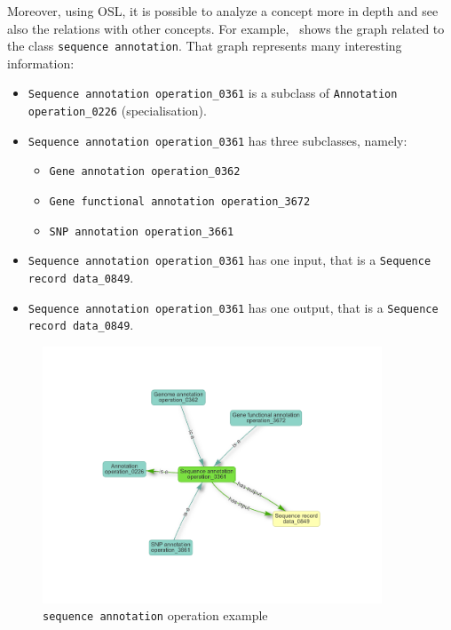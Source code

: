\documentclass{scrartcl}
\begin{document}
Moreover, using OSL, it is possible to analyze a concept more in depth and see also
  the relations with other concepts. For example,~ shows the graph 
  related to the class \texttt{sequence annotation}. That graph represents many interesting
  information:
  \begin{itemize}
    \item \texttt{Sequence annotation operation\_0361} is a subclass of \newline
      \texttt{Annotation operation\_0226} (specialisation).
    \item \texttt{Sequence annotation operation\_0361} has three subclasses, namely:
      \begin{itemize}
        \item \texttt{Gene annotation operation\_0362} 
        \item \texttt{Gene functional annotation operation\_3672} 
        \item \texttt{SNP annotation operation\_3661} 
      \end{itemize}
    \item \texttt{Sequence annotation operation\_0361} has one input, that is a \newline
      \texttt{Sequence record data\_0849}.
    \item \texttt{Sequence annotation operation\_0361} has one output, that is a \newline
    \texttt{Sequence record data\_0849}.
  \end{itemize}

\newpage

\begin{figure}[h!]
  \centering
  \includegraphics[width=0.9\textwidth]{imgs/sequence-annotation.png}
  \caption{\texttt{sequence annotation} operation example}
  \label{fig:graph}
\end{figure}
\end{document}
